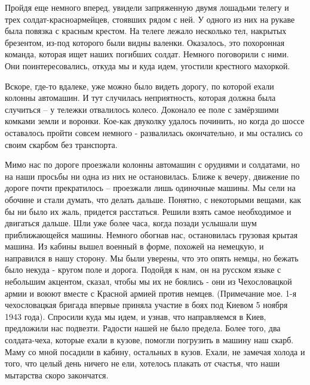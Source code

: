 
Пройдя еще немного вперед, увидели запряженную двумя лошадьми телегу и трех
солдат-красноармейцев, стоявших рядом с ней. У одного из них на рукаве была
повязка с красным крестом. На телеге лежало несколько тел, накрытых брезентом,
из-под которого были видны валенки. Оказалось, это похоронная команда, которая
ищет наших погибших солдат. Немного поговорили с ними. Они поинтересовались,
откуда мы и куда идем, угостили крестного махоркой.

Вскоре, где-то вдалеке, уже можно было видеть дорогу, по которой ехали колонны
автомашин. И тут случилась неприятность, которая должна была случиться – у
тележки отвалилось колесо. Доконало ее поле с замёрзшими комками земли и
воронки. Кое-как двуколку удалось починить, но когда до шоссе оставалось пройти
совсем немного - развалилась окончательно, и мы остались со своим скарбом без
транспорта. 


Мимо нас по дороге проезжали колонны автомашин с орудиями и
солдатами, но на наши просьбы ни одна из них не остановилась. Ближе к вечеру,
движение по дороге почти прекратилось – проезжали лишь одиночные машины. Мы
сели на обочине и стали думать, что делать дальше. Понятно, с некоторыми
вещами, как бы ни было их жаль, придется расстаться. Решили взять самое
необходимое и двигаться дальше. Шли уже более часа, когда позади услышали шум
приближающейся машины. Немного обогнав нас, остановилась грузовая крытая
машина. Из кабины вышел военный в форме, похожей на немецкую, и направился в
нашу сторону. Мы были уверены, что это опять немцы, но бежать было некуда -
кругом поле и дорога. Подойдя к нам, он на русском языке с небольшим акцентом,
сказал, чтобы мы их не боялись - они из Чехословацкой армии и воюют вместе с
Красной армией против немцев. (Примечание мое. 1-я чехословацкая бригада
впервые приняла участие в боях под Киевом 5 ноября 1943 года). Спросили куда мы
идем, и узнав, что направляемся в Киев, предложили нас подвезти. Радости нашей
не было предела. Более того, два солдата-чеха, которые ехали в кузове, помогли
погрузить в машину наш скарб. Маму со мной посадили в кабину, остальных в
кузов. Ехали, не замечая холода и того, что целый день ничего не ели, хотелось
плакать от счастья, что наши мытарства скоро закончатся.


